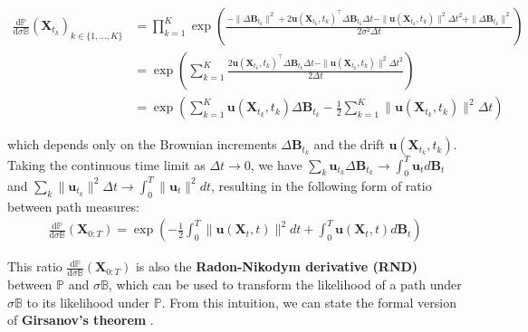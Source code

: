 \documentclass{article}
\newcommand{\boldtext}[1]{\textbf{\textcolor{MyGreen}{#1}}}
\begin{document}
\begin{small}
\begin{align}
    \frac{\mathrm{d}\mathbb{P}}{\mathrm{d}\sigma\mathbb{B}}(\boldsymbol{X}_{t_k})_{k\in \{1, \dots, K\}}&=\prod_{k=1}^K\exp\left(\frac{-\|\Delta \boldsymbol{B}_{t_k}\|^2+2\boldsymbol{u}(\boldsymbol{X}_{t_k}, t_k)^\top\Delta \boldsymbol{B}_{t_k}\Delta t-\|\boldsymbol{u}(\boldsymbol{X}_{t_k}, t_k)\|^2\Delta t^2+\|\Delta \boldsymbol{B}_{t_k}\|^2}{2\sigma^2\Delta t}\right)\nonumber\\
    &=\exp\left(\sum_{k=1}^K\frac{2\boldsymbol{u}(\boldsymbol{X}_{t_k}, t_k)^\top\Delta \boldsymbol{B}_{t_k}\Delta t-\|\boldsymbol{u}(\boldsymbol{X}_{t_k}, t_k)\|^2\Delta t^2}{2\Delta t}\right)\nonumber\\
    &=\exp\left(\sum_{k=1}^K\boldsymbol{u}(\boldsymbol{X}_{t_k}, t_k)\Delta \boldsymbol{B}_{t_k}-\frac{1}{2}\sum_{k=1}^K\|\boldsymbol{u}(\boldsymbol{X}_{t_k}, t_k)\|^2\Delta t\right)
\end{align}
\end{small}
which depends only on the Brownian increments $\Delta\boldsymbol{B}_{t_k}$ and the drift $\boldsymbol{u}(\boldsymbol{X}_{t_k},t_k)$. Taking the continuous time limit as $\Delta t\to 0$, we have $\sum_k\boldsymbol{u}_{t_k}\Delta \boldsymbol{B}_{t_k}\to \int_0^T\boldsymbol{u}_td\boldsymbol{B}_t$ and $\sum_k\|\boldsymbol{u}_{t_k}\|^2\Delta t\to \int_0^T\|\boldsymbol{u}_t\|^2dt$, resulting in the following form of ratio between path measures:
\begin{align}
    \frac{\mathrm{d}\mathbb{P}}{\mathrm{d}\sigma\mathbb{B}}(\boldsymbol{X}_{0:T})=\exp\left(-\frac{1}{2}\int_0^T\|\boldsymbol{u}(\boldsymbol{X}_t, t)\|^2dt+\int_0^T\boldsymbol{u}(\boldsymbol{X}_t, t)d\boldsymbol{B}_t\right)
\end{align}

This ratio $\frac{\mathrm{d}\mathbb{P}}{\mathrm{d}\sigma\mathbb{B}}(\boldsymbol{X}_{0:T})$ is also the \boldtext{Radon-Nikodym derivative (RND)} between $\mathbb{P}$ and $\sigma\mathbb{B}$, which can be used to transform the likelihood of a path under $\sigma\mathbb{B}$ to its likelihood under $\mathbb{P}$. From this intuition, we can state the formal version of \boldtext{Girsanov's theorem} \citep{girsanov1960transforming, karatzas2014brownian, oksendal2003stochastic}.
\end{document}
